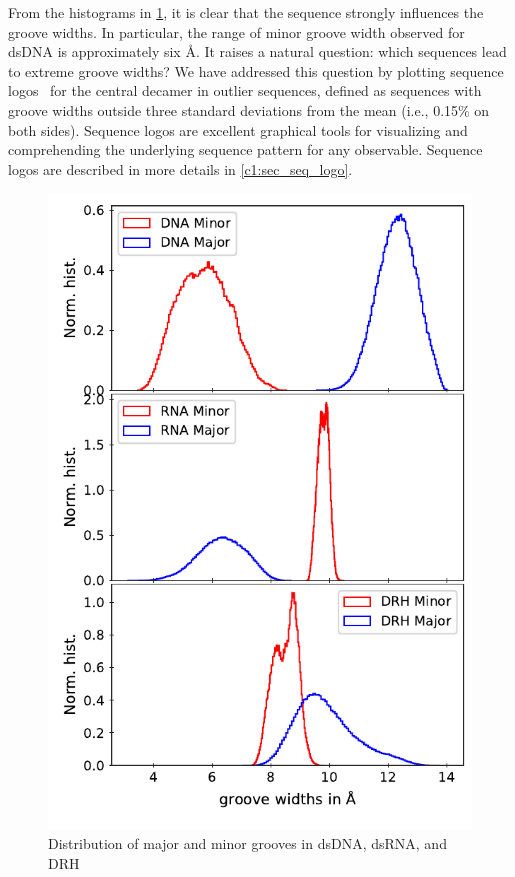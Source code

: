 From the histograms in \cref{c4:fig5_groove}, it is clear that the sequence strongly influences the groove widths.
In particular, the range of minor groove width observed for dsDNA is approximately six \AA.
It raises a natural question: which sequences lead to extreme groove widths?
We have addressed this question by plotting sequence logos~\cite{schneider1990sequence} for the central decamer in outlier sequences, defined as sequences with groove widths outside three standard deviations from the mean (i.e., 0.15\% on both sides).
Sequence logos are excellent graphical tools for visualizing and comprehending the underlying sequence pattern for any observable.
Sequence logos are described in more details in \cref{c1:sec_seq_logo}. 

\begin{figure}[H]
\begin{center}
 \centering\includegraphics[scale=0.8, trim = 0cm 1cm 0cm 0.7cm]{images/Grooves_DNA_RNA_HYB.pdf}
\end{center}
\centering\caption{
Distribution of major and minor grooves in dsDNA, dsRNA, and DRH
}
\label{c4:fig5_groove}
\end{figure}

